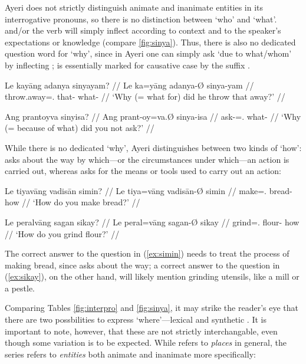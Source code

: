 Ayeri does not strictly distinguish animate and inanimate entities in its
interrogative pronouns, so there is no distinction between `who' and `what'.
 and/or the verb will simply inflect according to context and
to the speaker's expectations or knowledge (compare \autoref{fig:sinya}). Thus,
there is also no dedicated question word for `why', since in Ayeri one can
simply ask `due to what/whom' by inflecting ; 
 is essentially  marked for causative
case by the suffix .

\pex
\a\begingl
	\gla Le kayāng adanya sinyayam? //
	\glb Le ka=yāng adanya-Ø sinya-yam //
	\glc \PatTI{} throw.away=\TsgM{}.\Aarg{} that-\Top{} what-\Dat{} //
	\glft `Why (= what for) did he throw that away?' //
\endgl

\a\begingl
	\gla Ang prantoyva sinyisa? //
	\glb Ang prant-oy=va.Ø sinya-isa //
	\glc \AgtT{} ask-\Neg{}=\Ssg{}.\Top{} what-\Caus{} //
	\glft `Why (= because of what) did you not ask?' //
\endgl

\xe

While there is no dedicated `why', Ayeri distinguishes between two kinds of
`how':  asks about the way by which---or the circumstances
under which---an action is carried out, whereas  asks for the
means or tools used to carry out an action:

\pex
\a\label{ex:simin}\begingl
	\gla Le tiyavāng vadisān simin? //
	\glb Le tiya=vāng vadisān-Ø simin //
	\glc \PatTI{} make=\Ssg{}.\Aarg{} bread-\Top{} how //
	\glft `How do you make bread?' //
\endgl

\a\label{ex:sikay}\begingl
	\gla Le peralvāng sagan sikay? //
	\glb Le peral=vāng sagan-Ø sikay //
	\glc \PatTI{} grind=\Ssg{}.\Aarg{} flour-\Top{} how //
	\glft `How do you grind flour?' //
\endgl

\xe

The correct answer to the question in (\ref{ex:simin}) needs to treat the 
process of making bread, since  asks about the way; a 
correct answer to the question in (\ref{ex:sikay}), on the other hand, will 
likely mention grinding utensils, like a mill or a pestle.

Comparing Tables \ref{fig:interpro} and \ref{fig:sinya}, it may strike the 
reader's eye that there are two possbilities to express 
`where'---lexical  and synthetic . It 
is important to note, however, that these are not strictly interchangable, 
even though some variation is to be expected. While  refers 
to \emph{places} in general, the  series refers to 
\emph{entities} both animate and inanimate more specifically:

